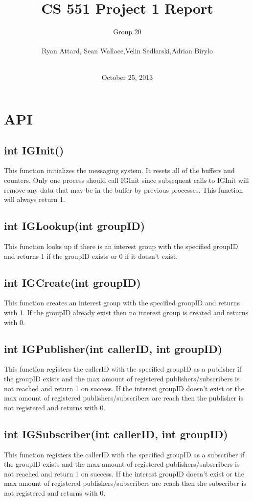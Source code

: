 \documentclass{article}
\title{CS 551 Project 1 Report}
\author{Group 20 \\\\ Ryan Attard, Sean Wallace,Velin Sedlarski,Adrian Birylo\\\\}
\date{October 25, 2013}
\begin{document}
\maketitle
\pagebreak 
\section{API}

\subsection{int IGInit()}
This function initializes the messaging system. It resets all of the buffers and counters. Only one process should call IGInit since subsequent calls to IGInit will remove any data that may be in the buffer by previous processes. This function will always return 1. 

\subsection{int IGLookup(int groupID)}
This function looks up if there is an interest group with the specified groupID and returns 1 if the groupID exists or 0 if it doesn't exist.

\subsection{int IGCreate(int groupID)}
This function creates an interest group with the specified groupID and returns with 1. If the groupID already exist then no interest group is created and returns with 0. 

\subsection{int IGPublisher(int callerID, int groupID)}
This function registers the callerID with the specified groupID as a publisher if the groupID exists and the max amount of registered publishers/subscribers is not reached and return 1 on success. If the interest groupID doesn't exist or the max amount of registered publishers/subscribers are reach then the publisher is not registered and returns with 0.

\subsection{int IGSubscriber(int callerID, int groupID)}
This function registers the callerID with the specified groupID as a subscriber if the groupID exists and the max amount of registered publishers/subscribers is not reached and return 1 on success. If the interest groupID doesn't exist or the max amount of registered publishers/subscribers are reach then the subscriber is not registered and returns with 0.
\end{document}
